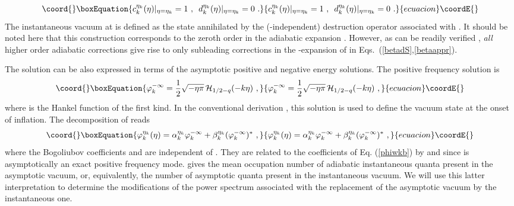 \documentclass[a4paper,aps,prd,preprint,groupedaddress,nofootinbib]{revtex4}
\begin{document}
\begin{equation}\coord{}\boxEquation{
\label{ci}
c_k^{\eta_k}(\eta)\vert_{\eta = \eta_k} = 1 \,\,,\,\,\, 
d_k^{\eta_k}(\eta)\vert_{\eta = \eta_k} = 0\,\,.
}{
c_k^{\eta_k}(\eta)\vert_{\eta = \eta_k} = 1 \,\,,\,\,\, 
d_k^{\eta_k}(\eta)\vert_{\eta = \eta_k} = 0\,\,.
}{ecuacion}\coordE{}\end{equation}
The instantaneous vacuum at \coordHE{} is defined as the 
state annihilated by the (\myHighlight{$\eta$}\coordHE{}-independent)
destruction operator associated with \coordHE{}. It
should be noted here that this construction corresponds to the zeroth
order in the adiabatic expansion \cite{BD84}. However, as can be
readily verified \cite{CNP02}, {\it all} higher order adiabatic
corrections give rise to only subleading corrections in the
\coordHE{}-expansion of \coordHE{} in
Eqs.~(\ref{betadS},\ref{betaappr}).  

The solution \coordHE{}
can be also expressed in terms of the asymptotic positive and
negative energy solutions. The positive frequency solution is 
\begin{equation}\coord{}\boxEquation{
\label{asymp}
\varphi_k^{-\infty} = 
\frac{1}{2} \sqrt{-\eta \pi}\,{\cal H}_{1/2 - q}(-k\eta)\,\,,
}{
\varphi_k^{-\infty} = 
\frac{1}{2} \sqrt{-\eta \pi}\,{\cal H}_{1/2 - q}(-k\eta)\,\,,
}{ecuacion}\coordE{}\end{equation}
where \coordHE{} is the Hankel function of the first kind.
In the conventional derivation \cite{MFB92}, this solution is used to
define the vacuum state at the onset of inflation. The decomposition
of \coordHE{} reads 
\begin{equation}\coord{}\boxEquation{
\varphi_k^{\eta_k}(\eta) =  \alpha_k^{\eta_k} \varphi_k^{-\infty} +
\beta_k^{\eta_k} (\varphi_k^{-\infty})^\ast\,\,,
}{
\varphi_k^{\eta_k}(\eta) =  \alpha_k^{\eta_k} \varphi_k^{-\infty} +
\beta_k^{\eta_k} (\varphi_k^{-\infty})^\ast\,\,,
}{ecuacion}\coordE{}\end{equation}
where the Bogoliubov coefficients
\coordHE{} and \coordHE{} are independent
of \myHighlight{$\eta$}\coordHE{}. They are related to the coefficients of Eq. (\ref{phiwkb})
by \coordHE{} and
\coordHE{} since \coordHE{} is
asymptotically an exact positive frequency mode.
\coordHE{}
gives the mean occupation number of adiabatic instantaneous quanta
present in the asymptotic vacuum, or, equivalently, the number of
asymptotic quanta present in the instantaneous vacuum. 
We will use this latter interpretation to determine
the modifications of the power spectrum associated with
the replacement of the asymptotic vacuum by the instantaneous one.
\end{document}
